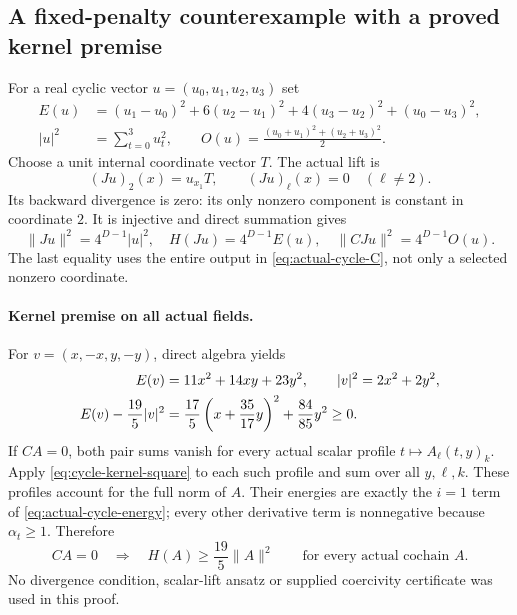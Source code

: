 \subsection{A fixed-penalty counterexample with a proved kernel premise}
For a real cyclic vector $u=(u_0,u_1,u_2,u_3)$ set
\begin{align*}
 E(u)&=(u_1-u_0)^2+6(u_2-u_1)^2+4(u_3-u_2)^2+(u_0-u_3)^2,\\
 |u|^2&=\sum_{t=0}^3u_t^2,\qquad
 O(u)=\frac{(u_0+u_1)^2+(u_2+u_3)^2}{2}.
\end{align*}
Choose a unit internal coordinate vector $T$. The actual lift is
\[
 (Ju)_2(x)=u_{x_1}T,\qquad (Ju)_\ell(x)=0\quad(\ell\ne2).
\]
Its backward divergence is zero: its only nonzero component is constant
in coordinate $2$. It is injective and direct summation gives
\begin{equation}\label{eq:cycle-transports}
 \|Ju\|^2=4^{D-1}|u|^2,\quad H(Ju)=4^{D-1}E(u),\quad
 \|CJu\|^2=4^{D-1}O(u).
\end{equation}
The last equality uses the entire output in \eqref{eq:actual-cycle-C},
not only a selected nonzero coordinate.

\paragraph{Kernel premise on all actual fields.}
For $v=(x,-x,y,-y)$, direct algebra yields
\begin{align}
 E(v)&=11x^2+14xy+23y^2,\qquad |v|^2=2x^2+2y^2,\notag\\
 E(v)-\frac{19}{5}|v|^2
   &=\frac{17}{5}\left(x+\frac{35}{17}y\right)^2
       +\frac{84}{85}y^2\geq0.\label{eq:cycle-kernel-square}
\end{align}
If $CA=0$, both pair sums vanish for every actual scalar profile
$t\mapsto A_\ell(t,y)_k$. Apply \eqref{eq:cycle-kernel-square}
to each such profile and sum over all $y,\ell,k$. These profiles account
for the full norm of $A$. Their energies are exactly the $i=1$ term
of \eqref{eq:actual-cycle-energy}; every other derivative term is
nonnegative because $\alpha_t\geq1$. Therefore
\begin{equation}\label{eq:full-physical-kernel}
 CA=0\quad\Longrightarrow\quad H(A)\geq\frac{19}{5}\|A\|^2
 \qquad\text{for every actual cochain }A.
\end{equation}
No divergence condition, scalar-lift ansatz or supplied coercivity
certificate was used in this proof.


